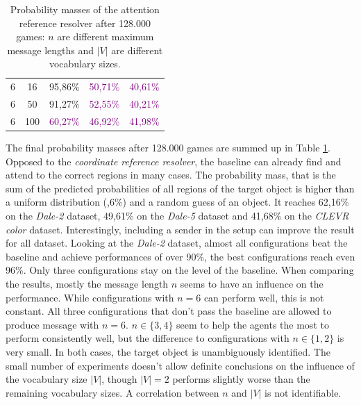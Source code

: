 \begin{table}[ht]
\begin{tabular}{cc|c|c|c}
        {6}                           & {16}      & {95,86\%}                           & \textcolor{purple}{50,71\%}         & \textcolor{purple}{40,61\%}              \\
        {6}                           & {50}      & {91,27\%}                           & \textcolor{purple}{52,55\%}         & \textcolor{purple}{40,21\%}              \\
        {6}                           & {100}     & \textcolor{purple}{60,27\%}         & \textcolor{purple}{46,92\%}         & \textcolor{purple}{41,98\%}              \\
        \bottomrule
    \end{tabular}
    \caption{Probability masses of the attention reference resolver after 128.000 games: $n$ are different maximum message lengths and $|V|$ are different vocabulary sizes.}
    \label{tab:results:attention-reference-resolver-game}
\end{table}

The final probability masses after 128.000 games are summed up in Table \ref{tab:results:attention-reference-resolver-game}.
Opposed to the \emph{coordinate reference resolver}, the baseline can already find and attend to the correct regions in many cases.
The probability mass, that is the sum of the predicted probabilities of all regions of the target object is higher than a uniform distribution (,6\%) and a random guess of an object.
It reaches 62,16\% on the \emph{Dale-2} dataset, 49,61\% on the \emph{Dale-5} dataset and 41,68\% on the \emph{CLEVR color} dataset.
Interestingly, including a sender in the setup can improve the result for all dataset.
Looking at the \emph{Dale-2} dataset, almost all configurations beat the baseline and achieve performances of over 90\%, the best configurations reach even 96\%.
Only three configurations stay on the level of the baseline.
When comparing the results, mostly the message length $n$ seems to have an influence on the performance.
While configurations with $n=6$ can perform well, this is not constant.
All three configurations that don't pass the baseline are allowed to produce message with $n=6$.
$n \in \{3,4\}$ seem to help the agents the most to perform consistently well, but the difference to configurations with $n \in \{1,2\}$ is very small.
In both cases, the target object is unambiguously identified.
The small number of experiments doesn't allow definite conclusions on the influence of the vocabulary size $|V|$, though $|V|=2$ performs slightly worse than the remaining vocabulary sizes.
A correlation between $n$ and $|V|$ is not identifiable.

